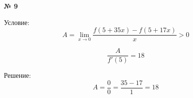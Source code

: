 \documentclass{article}
\begin{document}
\textbf{№ 9} 
\large

Условие:
$$ A = \lim\limits_{x \to 0} \frac{f(5+35x) - f(5+17x)}{x} > 0 $$  

$$ \frac{A}{f'(5)} = 18 $$

Решение:
$$ A = \frac{0}{0}
= \frac{35-17}{1}
= 18 $$
\end{document}

